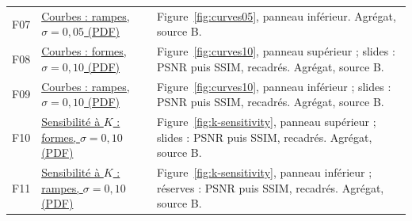 \begin{longtable}{@{}p{0.9cm}p{6.1cm}p{7.7cm}@{}}
F07 & \href{https://github.com/halhoulmhamed-droid/pde-image-denoising/blob/ae03109cdb2150b760e5a4b8bcffb56bba1b98e0/results/extended/figures/metric_curves_ramps_and_edges_sigma0p05.pdf}{Courbes : rampes, $\sigma=0{,}05$ (PDF)} & Figure~\ref{fig:curves05}, panneau inférieur. Agrégat, source B. \\
F08 & \href{https://github.com/halhoulmhamed-droid/pde-image-denoising/blob/ae03109cdb2150b760e5a4b8bcffb56bba1b98e0/results/extended/figures/metric_curves_geometric_shapes_sigma0p1.pdf}{Courbes : formes, $\sigma=0{,}10$ (PDF)} & Figure~\ref{fig:curves10}, panneau supérieur ; slides : PSNR puis SSIM, recadrés. Agrégat, source B. \\
F09 & \href{https://github.com/halhoulmhamed-droid/pde-image-denoising/blob/ae03109cdb2150b760e5a4b8bcffb56bba1b98e0/results/extended/figures/metric_curves_ramps_and_edges_sigma0p1.pdf}{Courbes : rampes, $\sigma=0{,}10$ (PDF)} & Figure~\ref{fig:curves10}, panneau inférieur ; slides : PSNR puis SSIM, recadrés. Agrégat, source B. \\
F10 & \href{https://github.com/halhoulmhamed-droid/pde-image-denoising/blob/ae03109cdb2150b760e5a4b8bcffb56bba1b98e0/results/extended/figures/k_sensitivity_geometric_shapes_sigma0p1.pdf}{Sensibilité à $K$ : formes, $\sigma=0{,}10$ (PDF)} & Figure~\ref{fig:k-sensitivity}, panneau supérieur ; slides : PSNR puis SSIM, recadrés. Agrégat, source B. \\
F11 & \href{https://github.com/halhoulmhamed-droid/pde-image-denoising/blob/ae03109cdb2150b760e5a4b8bcffb56bba1b98e0/results/extended/figures/k_sensitivity_ramps_and_edges_sigma0p1.pdf}{Sensibilité à $K$ : rampes, $\sigma=0{,}10$ (PDF)} & Figure~\ref{fig:k-sensitivity}, panneau inférieur ; réserves : PSNR puis SSIM, recadrés. Agrégat, source B. \\
\bottomrule
\end{longtable}

